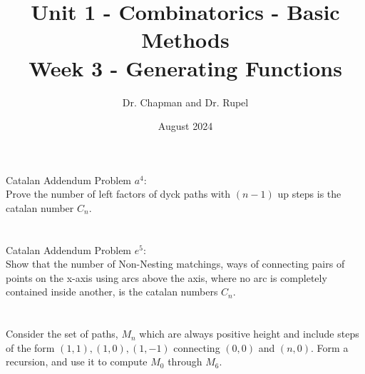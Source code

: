 \documentclass{article}
\title{Unit 1 - Combinatorics - Basic Methods\\ Week 3 - Generating Functions}
\author{Dr. Chapman and Dr. Rupel}
\date{August 2024}
\begin{document}
\maketitle
\section{}
Catalan Addendum Problem $a^4$: \\
Prove the number of left factors of dyck paths with $(n - 1)$ up steps is the catalan number $C_n$.
\section{}
Catalan Addendum Problem $e^5$: \\
Show that the number of Non-Nesting matchings, ways of connecting pairs of points on the x-axis using arcs
above the axis, where no arc is completely contained inside another, is the catalan numbers $C_n$.
\section{}
Consider the set of paths, $M_n$ which are always positive height and include steps of the form $(1,1), (1,0), (1, - 1)$
connecting $(0,0)$ and $(n,0)$. Form a recursion, and use it to compute $M_0$ through $M_6$.
\end{document}
